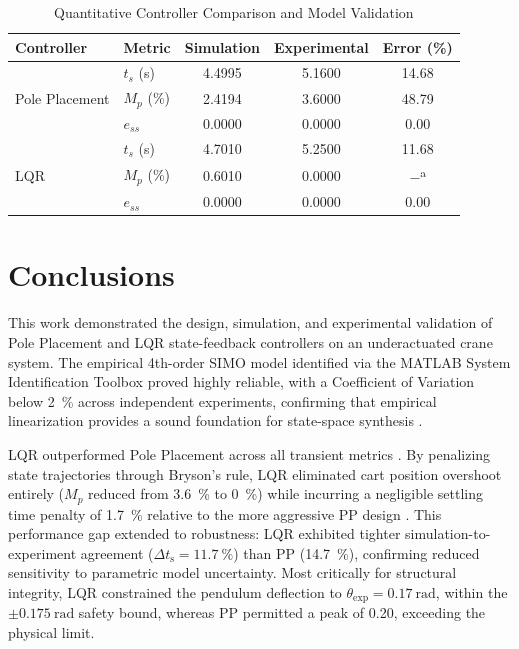 \documentclass[journal,twocolumn]{IEEEtran}
\begin{document}
\begin{table}[H]
    \centering
    \caption{Quantitative Controller Comparison and Model Validation}
    \label{tab:comp}
    \small
    \begin{tabular}{llccc}
        \toprule
        \textbf{Controller} & \textbf{Metric} & \textbf{Simulation} 
            & \textbf{Experimental} & \textbf{Error (\%)} \\
        \midrule
        \multirow{3}{*}{Pole Placement} & $t_s$ (s)  & 4.4995 & 5.1600 & 14.68 \\
                                        & $M_p$ (\%) & 2.4194 & 3.6000 & 48.79 \\
                                        & $e_{ss}$   & 0.0000 & 0.0000 & 0.00  \\
        \midrule
        \multirow{3}{*}{LQR}            & $t_s$ (s)  & 4.7010 & 5.2500 & 11.68 \\
                                        & $M_p$ (\%) & 0.6010 & 0.0000 & $-$\textsuperscript{a} \\
                                        & $e_{ss}$   & 0.0000 & 0.0000 & 0.00  \\
        \bottomrule
    \end{tabular}
    \vspace{4pt}
\end{table}	

\section{Conclusions}

This work demonstrated the design, simulation, and experimental validation of Pole 
Placement and LQR state-feedback controllers on an underactuated crane system. The 
empirical 4th-order SIMO model identified via the MATLAB System Identification Toolbox 
proved highly reliable, with a Coefficient of Variation below \qty{2}{\percent} across independent 
experiments, confirming that empirical linearization provides a sound foundation for 
state-space synthesis \cite{ljung, mathworks}.

LQR outperformed Pole Placement across all transient metrics \cite{ogata}. By penalizing state 
trajectories through Bryson's rule, LQR eliminated cart position overshoot entirely 
($M_p$ reduced from \qty{3.6}{\percent} to \qty{0}{\percent}) while incurring a negligible settling time 
penalty of \qty{1.7}{\percent} relative to the more aggressive PP design \cite{anderson}. This performance gap 
extended to robustness: LQR exhibited tighter simulation-to-experiment agreement 
($\Delta t_{\text{s}} = \qty{11.7}{\percent}$) than PP (\qty{14.7}{\percent}), confirming reduced sensitivity to 
parametric model uncertainty. Most critically for structural integrity, LQR constrained 
the pendulum deflection to $\theta_{\mathrm{exp}} = \qty{0.17}{\text{rad}}$, within the 
$\pm\qty{0.175}{\text{rad}}$ safety bound, whereas PP permitted a peak of \qty{0.20}{}, 
exceeding the physical limit.
\end{document}
